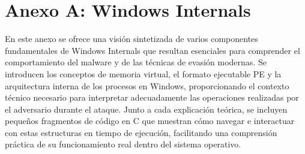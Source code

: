 \chapter{Anexo A: Windows Internals}

En este anexo se ofrece una visión sintetizada de varios componentes fundamentales de Windows Internals que resultan esenciales para comprender el comportamiento del malware y de las técnicas de evasión modernas. Se introducen los conceptos de memoria virtual, el formato ejecutable PE y la arquitectura interna de los procesos en Windows, proporcionando el contexto técnico necesario para interpretar adecuadamente las operaciones realizadas por el adversario durante el ataque. Junto a cada explicación teórica, se incluyen pequeños fragmentos de código en C que muestran cómo navegar e interactuar con estas estructuras en tiempo de ejecución, facilitando una comprensión práctica de su funcionamiento real dentro del sistema operativo.


\newpage

\newpage

\newpage

\newpage

\newpage
